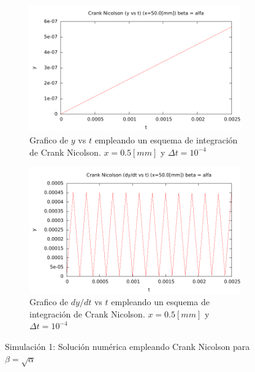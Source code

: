 \begin{center}
\begin{figure} [H]
	\begin{subfigure}[b]{0.8\textwidth}
		\includegraphics{./parte3/graficos/grafico_cn_S1_y_b2.pdf}
		\caption{Grafico de $y$ vs $t$ empleando un esquema de integración de Crank Nicolson. $x=0.5[mm]$ y $\Delta t=10^{-4}$} 
		\label{fig:cnS1b2_y}
	\end{subfigure}
	
	\begin{subfigure}[b]{0.8\textwidth}
		\includegraphics{./parte3/graficos/grafico_cn_S1_dy_b2.pdf}
		\caption{Grafico de $dy/dt$ vs $t$ empleando un esquema de integración de Crank Nicolson. $x=0.5[mm]$ y $\Delta t=10^{-4}$} 
		\label{fig:cnS1b2_dy}
	\end{subfigure}
\caption{Simulación 1: Solución numérica empleando Crank Nicolson para $\beta=\sqrt{\alpha}$ } \label{cn_S1_b2}
\end{figure}
\end{center}


